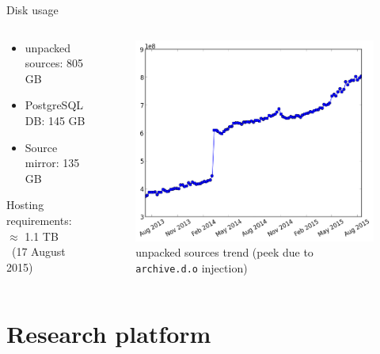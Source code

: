 \documentclass{beamer}
\begin{document}
\begin{frame}{Disk usage}
  \begin{columns}
    \begin{column}{0.5\textwidth}
      \begin{itemize}
      \item unpacked sources: \hfill 805 GB
      \item PostgreSQL DB: \hfill 145 GB
      \item Source mirror: \hfill 135 GB
      \end{itemize}
      \alert{Hosting requirements}: \hfill $\approx$ 1.1
      TB\\[1ex]
      ~\hfill {\footnotesize (17 August 2015)}
    \end{column}
    \pause
    \begin{column}{0.5\textwidth}
      \begin{figure}
        \centering
        \includegraphics[width=\textwidth]{img/disk-usage}
        \caption{unpacked sources trend (peek due to
          \texttt{archive.d.o}
          injection)}
      \end{figure}
    \end{column}
  \end{columns}
\end{frame}

\section{Research platform}
\end{document}

